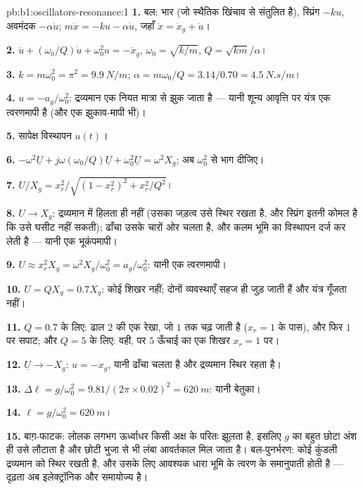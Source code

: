 \begin{solution}{pb:b1:oscillators-resonance:1}
\textbf{1.} बल: भार (जो स्थैतिक खिंचाव से संतुलित है), स्प्रिंग
$-ku$, अवमंदक $-\alpha\dot u$; $m\ddot x = -ku - \alpha\dot u$, जहाँ $\ddot x =
\ddot x_g + \ddot u$।

\textbf{2.} $\ddot u + (\omega_0/Q)\dot u + \omega_0^2u = -\ddot x_g$, $\omega_0 =
\sqrt{k/m}$, $Q = \sqrt{km}/\alpha$।

\textbf{3.} $k = m\omega_0^2 = \pi^2 = \qty{9.9}{N/m}$; $\alpha = m\omega_0/Q =
3.14/0.70 = \qty{4.5}{N.s/m}$।

\textbf{4.} $u = -a_g/\omega_0^2$: द्रव्यमान एक नियत मात्रा से झुक जाता है
--- यानी शून्य आवृत्ति पर यंत्र एक त्वरणमापी है (और एक झुकाव-मापी भी)।

\textbf{5.} सापेक्ष विस्थापन $u(t)$।

\textbf{6.} $-\omega^2\underline U + j\omega(\omega_0/Q)\underline U + \omega_0^2\underline U
= \omega^2X_g$; अब $\omega_0^2$ से भाग दीजिए।

\textbf{7.} $U/X_g = x_r^2/\sqrt{(1 - x_r^2)^2 + x_r^2/Q^2}$।

\textbf{8.} $U \to X_g$: द्रव्यमान  में हिलता ही नहीं (उसका
जड़त्व उसे स्थिर रखता है, और स्प्रिंग इतनी कोमल है कि उसे घसीट नहीं सकती);
ढाँचा उसके चारों ओर चलता है, और कलम भूमि का विस्थापन दर्ज कर लेती है
--- यानी एक भूकंपमापी।

\textbf{9.} $U \approx x_r^2X_g = \omega^2X_g/\omega_0^2 = a_g/\omega_0^2$: यानी
एक त्वरणमापी।

\textbf{10.} $U = QX_g = 0.7X_g$: कोई शिखर नहीं; दोनों व्यवस्थाएँ सहज ही
जुड़ जाती हैं और यंत्र गूँजता नहीं।

\textbf{11.} $Q = 0.7$ के लिए: ढाल $2$ की एक रेखा, जो $1$ तक चढ़ जाती है
($x_r = 1$ के पास), और फिर $1$ पर सपाट; और $Q = 5$ के लिए: वही, पर
$5$ ऊँचाई का एक शिखर $x_r = 1$ पर।

\textbf{12.} $\underline U \to -X_g$: $u = -x_g$, यानी ढाँचा चलता है और
द्रव्यमान स्थिर रहता है।

\textbf{13.} $\Delta\ell = g/\omega_0^2 = 9.81/(2\pi \times 0.02)^2 = \qty{620}{m}$:
यानी बेतुका।

\textbf{14.} $\ell = g/\omega_0^2 = \qty{620}{m}$।

\textbf{15.} बाग़-फाटक: लोलक लगभग ऊर्ध्वाधर किसी अक्ष के परितः झूलता है,
इसलिए $g$ का बहुत छोटा अंश ही उसे लौटाता है और छोटी भुजा से भी लंबा
आवर्तकाल मिल जाता है। बल-पुनर्भरण: कोई कुंडली द्रव्यमान को स्थिर रखती है,
और उसके लिए आवश्यक धारा भूमि के त्वरण के समानुपाती होती है --- दृढ़ता अब
इलेक्ट्रॉनिक और समायोज्य है।


\end{solution}

